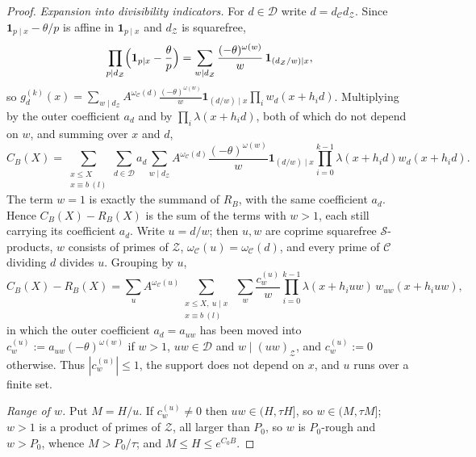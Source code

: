 \documentclass[preprint,12pt]{elsarticle}
\numberwithin{equation}{section}
\theoremstyle{plain}
\theoremstyle{definition}
\theoremstyle{definition}
\theoremstyle{remark}
\begin{document}
\begin{proof}
\emph{Expansion into divisibility indicators.} For $d\in\mathcal D$ write $d=d_{\mathcal C}d_{\mathcal Z}$. Since $\mathbf 1_{p\mid x}-\theta/p$ is affine in $\mathbf 1_{p\mid x}$ and $d_{\mathcal Z}$ is squarefree,
\[
\prod_{p\mid d_{\mathcal Z}}\Bigl(\mathbf 1_{p\mid x}-\frac\theta p\Bigr)=\sum_{w\mid d_{\mathcal Z}}\frac{(-\theta)^{\omega(w)}}w\,\mathbf 1_{(d_{\mathcal Z}/w)\mid x},
\]
so $g^{(k)}_d(x)=\sum_{w\mid d_{\mathcal Z}}A^{\omega_{\mathcal C}(d)}\frac{(-\theta)^{\omega(w)}}w\mathbf 1_{(d/w)\mid x}\prod_iw_d(x+h_id)$. Multiplying by the outer coefficient $a_d$ and by $\prod_i\lambda(x+h_id)$, both of which do not depend on $w$, and summing over $x$ and $d$,
\[
C_B(X)=\sum_{\substack{x\le X\\ x\equiv b\ (l)}}\sum_{d\in\mathcal D}a_d\sum_{w\mid d_{\mathcal Z}}A^{\omega_{\mathcal C}(d)}\frac{(-\theta)^{\omega(w)}}w\mathbf 1_{(d/w)\mid x}\prod_{i=0}^{k-1}\lambda(x+h_id)w_d(x+h_id).
\]
The term $w=1$ is exactly the summand of $R_B$, with the same coefficient $a_d$. Hence $C_B(X)-R_B(X)$ is the sum of the terms with $w>1$, each still carrying its coefficient $a_d$. Write $u=d/w$; then $u,w$ are coprime squarefree $\mathcal S$-products, $w$ consists of primes of $\mathcal Z$, $\omega_{\mathcal C}(u)=\omega_{\mathcal C}(d)$, and every prime of $\mathcal C$ dividing $d$ divides $u$. Grouping by $u$,
\[
C_B(X)-R_B(X)=\sum_{u}A^{\omega_{\mathcal C}(u)}\sum_{\substack{x\le X,\ u\mid x\\ x\equiv b\ (l)}}\ \sum_{w}\frac{c^{(u)}_w}w\prod_{i=0}^{k-1}\lambda(x+h_iuw)\,w_{uw}(x+h_iuw),
\]
in which the outer coefficient $a_d=a_{uw}$ has been moved into $c^{(u)}_w:=a_{uw}(-\theta)^{\omega(w)}$ if $w>1$, $uw\in\mathcal D$ and $w\mid(uw)_{\mathcal Z}$, and $c^{(u)}_w:=0$ otherwise. Thus $|c^{(u)}_w|\le1$, the support does not depend on $x$, and $u$ runs over a finite set.

\emph{Range of $w$.} Put $M=H/u$. If $c^{(u)}_w\ne0$ then $uw\in(H,\tau H]$, so $w\in(M,\tau M]$; $w>1$ is a product of primes of $\mathcal Z$, all larger than $P_0$, so $w$ is $P_0$-rough and $w>P_0$, whence $M>P_0/\tau$; and $M\le H\le e^{C_0B}$.


\end{proof}
\end{document}
